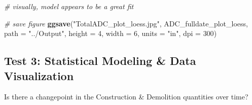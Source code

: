 \documentclass[12pt,]{article}
\newenvironment{Shaded}{\begin{snugshade}}{\end{snugshade}}
\newcommand{\KeywordTok}[1]{\textcolor[rgb]{0.13,0.29,0.53}{\textbf{#1}}}
\newcommand{\DataTypeTok}[1]{\textcolor[rgb]{0.13,0.29,0.53}{#1}}
\newcommand{\DecValTok}[1]{\textcolor[rgb]{0.00,0.00,0.81}{#1}}
\newcommand{\StringTok}[1]{\textcolor[rgb]{0.31,0.60,0.02}{#1}}
\newcommand{\CommentTok}[1]{\textcolor[rgb]{0.56,0.35,0.01}{\textit{#1}}}
\newcommand{\NormalTok}[1]{#1}
\begin{document}
\begin{Shaded}
\begin{Highlighting}[]
\CommentTok{# visually, model appears to be a great fit}

\CommentTok{# save figure}
\KeywordTok{ggsave}\NormalTok{(}\StringTok{"TotalADC_plot_loess.jpg"}\NormalTok{, ADC_fulldate_plot_loess, }\DataTypeTok{path =} \StringTok{"../Output"}\NormalTok{, }\DataTypeTok{height =} \DecValTok{4}\NormalTok{, }\DataTypeTok{width =} \DecValTok{6}\NormalTok{, }\DataTypeTok{units =} \StringTok{"in"}\NormalTok{, }\DataTypeTok{dpi =} \DecValTok{300}\NormalTok{)}
\end{Highlighting}
\end{Shaded}

\subsection{Test 3: Statistical Modeling \& Data
Visualization}\label{test-3-statistical-modeling-data-visualization}

Is there a changepoint in the Construction \& Demolition quantities over
time?
\end{document}
